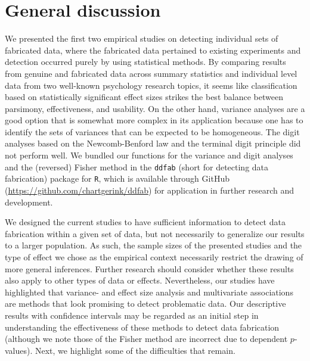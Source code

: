 \documentclass[a5paper]{book}
\begin{document}
\section{General discussion}\label{general-discussion-1}

We presented the first two empirical studies on detecting individual
sets of fabricated data, where the fabricated data pertained to existing
experiments and detection occurred purely by using statistical methods.
By comparing results from genuine and fabricated data across summary
statistics and individual level data from two well-known psychology
research topics, it seems like classification based on statistically
significant effect sizes strikes the best balance between parsimony,
effectiveness, and usability. On the other hand, variance analyses are a
good option that is somewhat more complex in its application because one
has to identify the sets of variances that can be expected to be
homogeneous. The digit analyses based on the Newcomb-Benford law and the
terminal digit principle did not perform well. We bundled our functions
for the variance and digit analyses and the (reversed) Fisher method in
the \texttt{ddfab} (short for detecting data fabrication) package for
\texttt{R}, which is available through GitHub
(\url{https://github.com/chartgerink/ddfab}) for application in further
research and development.

We designed the current studies to have sufficient information to detect
data fabrication within a given set of data, but not necessarily to
generalize our results to a larger population. As such, the sample sizes
of the presented studies and the type of effect we chose as the
empirical context necessarily restrict the drawing of more general
inferences. Further research should consider whether these results also
apply to other types of data or effects. Nevertheless, our studies have
highlighted that variance- and effect size analysis and multivariate
associations are methods that look promising to detect problematic data.
Our descriptive results with confidence intervals may be regarded as an
initial step in understanding the effectiveness of these methods to
detect data fabrication (although we note those of the Fisher method are
incorrect due to dependent \(p\)-values). Next, we highlight some of the
difficulties that remain.
\end{document}

